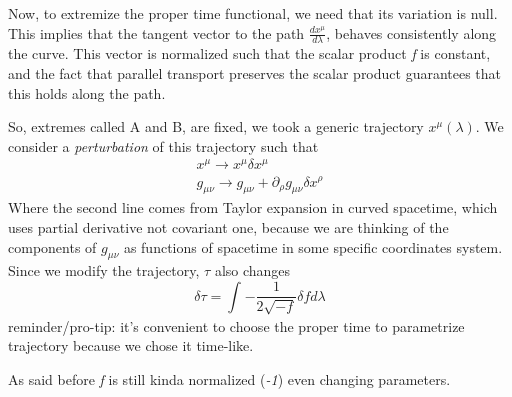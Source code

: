 Now, to extremize the proper time functional, we need that its variation is null. This implies that the tangent vector to the path $\frac{d x^{\mu }}{d \lambda }$, behaves consistently along the curve. This vector is normalized such that the scalar product \emph{f} is constant, and the fact that parallel transport preserves the scalar product guarantees that this holds along the path.\par
So, extremes called A and B, are fixed, we took a generic trajectory $x^{\mu }\left( \lambda  \right)$.
We consider a \emph{perturbation} of this trajectory such that
\begin{gather*}
x^{\mu  }\to x^{\mu }\delta x^{\mu } \\
g_{\mu \nu } \to  g_{\mu \nu } + \partial_{\rho }g_{\mu \nu } \delta  x^{\rho }
\end{gather*}
Where the second line comes from Taylor expansion in curved spacetime, which uses partial derivative not covariant one, because we are thinking of the components of $g_{\mu \nu }$ as functions of spacetime in some specific coordinates system.
Since we modify the trajectory, $\tau$ also changes
\[
	\delta \tau = \int_{}^{}{-\frac{1}{2\sqrt{-f}}\delta f d\lambda }
\]
{\footnotesize reminder/pro-tip: it's convenient to choose the proper time to parametrize trajectory because we chose it time-like.}\par

As said before \emph{f} is still kinda normalized (\emph{-1}) even changing parameters. 

